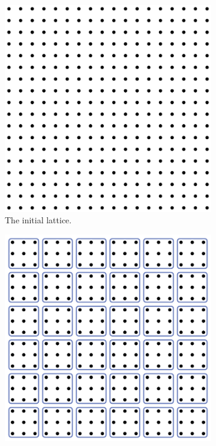 \begin{figure}[htp]
\centering
\begin{subfigure}{.25\textwidth}
	\centering
	\includegraphics[width=.9\linewidth]{img/chap2/renorm_step0.pdf}
	\caption{The initial lattice.}
	\label{renorm_0}
	\end{subfigure}%
\begin{subfigure}{.25\textwidth}
	\centering
	\includegraphics[width=.9\linewidth]{img/chap2/renorm_step1.pdf}

\end{subfigure}
\end{figure}
